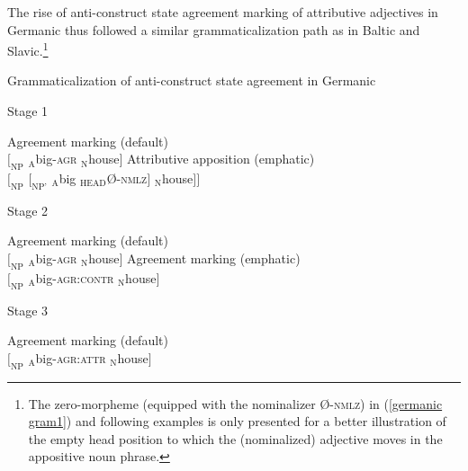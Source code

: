 {The rise of anti\hyp{}construct state agreement marking of attributive adjectives in Germanic thus followed a similar grammaticalization path as in Baltic and Slavic.\footnote{The zero-morpheme (equipped with the nominalizer Ø-\textsc{nmlz}) in (\ref{germanic gram1}) and following examples is only presented for a better illustration of the empty head position to which the (nominalized) adjective moves in the appositive noun phrase.}
\begin{exe}
\ex \label{germanic gram1} 
	\rm{Grammaticalization of anti\hyp{}construct state agreement in Germanic}
\begin{xlist}
\ex \label{germanic1}
	\rm{Stage 1}
\begin{xlist}
\ex	\rm{Agreement marking (default)}\\
$[_{\text{NP}}$ $_{\text{A}}$big-\textsc{agr} $_{\text{N}}$house$]$
\ex	\rm{Attributive apposition (emphatic)}\\
$[_{\text{NP}}$ $[_{\text{NP'}}$ $_{\text{A}}$big $_{\text{HEAD}}$Ø-\textsc{nmlz}$]$ $_{\text{N}}$house$] ]$\label{germanic art1}
\end{xlist}
\ex \label{germanic2}
	\rm{Stage 2} 
\begin{xlist}
\ex	\rm{Agreement marking (default)}\\
$[_{\text{NP}}$ $_{\text{A}}$big-\textsc{agr} $_{\text{N}}$house$]$
\ex	\rm{Agreement marking (emphatic)}\\
$[_{\text{NP}}$ $_{\text{A}}$big-\textsc{agr:contr} $_{\text{N}}$house$]$\label{germanic ACAgr}
\end{xlist}
\ex \label{germanic3}
	\rm{Stage 3}
\begin{xlist}
\ex 	\rm{Agreement marking (default)}\\
$[_{\text{NP}}$ $_{\text{A}}$big-\textsc{agr:attr} $_{\text{N}}$house$]$
\end{xlist}
\end{xlist}
\end{exe}
}
